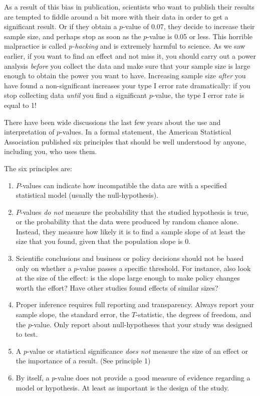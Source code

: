 \documentclass[]{report}\usepackage[]{graphicx}\usepackage[]{color}
\begin{document}
As a result of this bias in publication, scientists who want to publish their results are tempted to fiddle around a bit more with their data in order to get a significant result. Or if they obtain a $p$-value of 0.07, they decide to increase their sample size, and perhaps stop as soon as the $p$-value is 0.05 or less. This horrible malpractice is called \textit{$p$-hacking} and is extremely harmful to science. As we saw earlier, if you want to find an effect and not miss it, you should carry out a power analysis \textit{before} you collect the data and make sure that your sample size is large enough to obtain the power you want to have. Increasing sample size \textit{after} you have found a non-significant  increases your type I error rate dramatically: if you stop collecting data \textit{until} you find a significant $p$-value, the type I error rate is equal to 1!

There have been wide discussions the last few years about the use and interpretation of $p$-values. In a formal statement, the American Statistical Association published six principles that should be well understood by anyone, including you, who uses them.


The six principles are:

\begin{enumerate}

\item
$P$-values can indicate how incompatible the data are with a specified statistical model (usually the null-hypothesis).
\item
$P$-values \textit{do not} measure the probability that the studied hypothesis is true, or the probability that the data were produced by random chance alone. Instead, they measure how likely it is to find a sample slope of at least the size that you found, given that the population slope is 0.
\item
Scientific conclusions and business or policy decisions should not be based only on whether a $p$-value passes a specific threshold. For instance, also look at the size of the effect: is the slope large enough to make policy changes worth the effort? Have other studies found effects of similar sizes?
\item
Proper inference requires full reporting and transparency. Always report your sample slope, the standard error, the $T$-statistic, the degrees of freedom, and the $p$-value. Only report about null-hypotheses that your study was designed to test.
\item
A $p$-value or statistical significance \textit{does not} measure the size of an effect or the importance of a result. (See principle 1)
\item
By itself, a $p$-value does not provide a good measure of evidence regarding a model or hypothesis. At least as important is the design of the study.
\end{enumerate}
\end{document}
